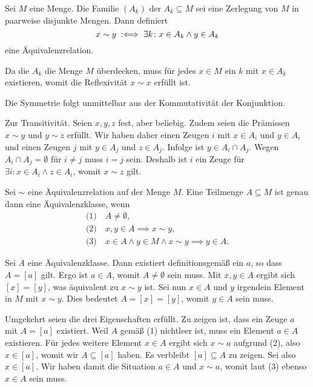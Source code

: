 \begin{Satz}%
\label{eq-relation-from-partition}\newlinefirst
Sei $M$ eine Menge. Die Familie $(A_k)$ der $A_k\subseteq M$ sei
eine Zerlegung von $M$ in paarweise disjunkte Mengen. Dann definiert
\[x\sim y\;:\Longleftrightarrow\; \exists k\colon x\in A_k\land y\in A_k\]
eine Äquivalenzrelation.
\end{Satz}
\begin{Beweis}
Da die $A_k$ die Menge $M$ überdecken, muss für jedes $x\in M$
ein $k$ mit $x\in A_k$ existieren, womit die Reflexivität
$x\sim x$ erfüllt ist.

Die Symmetrie folgt unmittelbar aus der Kommutativität der Konjunktion.

Zur Transitivität. Seien $x,y,z$ fest, aber beliebig. Zudem seien die
Prämissen $x\sim y$ und $y\sim z$ erfüllt. Wir haben daher einen Zeugen
$i$ mit $x\in A_i$ und $y\in A_i$ und einen Zeugen $j$ mit $y\in A_j$
und $z\in A_j$. Infolge ist $y\in A_i\cap A_j$. Wegen
$A_i\cap A_j=\emptyset$ für $i\ne j$ muss $i=j$ sein. Deshalb ist
$i$ ein Zeuge für $\exists i\colon x\in A_i\land z\in A_i$, womit
$x\sim z$ gilt.\,\qedsymbol
\end{Beweis}

\begin{Satz}\newlinefirst
Sei $\sim$ eine Äquivalenzrelation auf der Menge $M$. Eine
Teilmenge $A\subseteq M$ ist genau dann eine Äquivalenzklasse, wenn%
\begin{gather*}
\text{(1)}\quad A\ne\emptyset,\\
\text{(2)}\quad x,y\in A\implies x\sim y,\\
\text{(3)}\quad x\in A\land y\in M\land x\sim y\implies y\in A.
\end{gather*}
\end{Satz}
\begin{Beweis}
Sei $A$ eine Äquivalenzklasse. Dann existiert definitionsgemäß
ein $a$, so dass $A=[a]$ gilt. Ergo ist $a\in A$, womit
$A\ne\emptyset$ sein muss. Mit $x,y\in A$ ergibt sich $[x]=[y]$,
was äquivalent zu $x\sim y$ ist. Sei nun $x\in A$ und $y$ irgendein
Element in $M$ mit $x\sim y$. Dies bedeutet $A=[x]=[y]$, womit
$y\in A$ sein muss.

Umgekehrt seien die drei Eigenschaften erfüllt. Zu zeigen ist,
dass ein Zeuge $a$ mit $A=[a]$ existiert. Weil $A$ gemäß (1)
nichtleer ist, muss ein Element $a\in A$ existieren. Für jedes
weitere Element $x\in A$ ergibt sich $x\sim a$ aufgrund (2),
also $x\in [a]$, womit wir $A\subseteq [a]$ haben.
Es verbleibt $[a]\subseteq A$ zu zeigen. Sei also $x\in [a]$.
Wir haben damit die Situation $a\in A$ und $x\sim a$, womit
laut (3) ebenso $x\in A$ sein muss.\,\qedsymbol
\end{Beweis}

